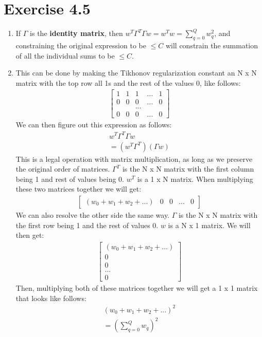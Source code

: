 \documentclass[12pt]{article}
\begin{document}
\section*{Exercise 4.5}
\begin{enumerate}[label=(\alph*)]
	\item If $\Gamma$ is the \textbf{identity matrix}, then $w^T\Gamma^T\Gamma w = w^Tw = \sum^Q_{q=0}w_q^2$, and constraining the original expression to be $\le C$ will constrain the summation of all the individual sums to be $\le C$.
	\item This can be done by making the Tikhonov regularization constant an N x N matrix with the top row all 1s and the rest of the values 0, like follows:
	\begin{gather*}
	\begin{bmatrix}
	1 & 1 & 1 & ... & 1
	\\ 0 & 0 & 0 & ... & 0
	\\ & & ...
	\\ 0 & 0 & 0 & ... & 0
	\end{bmatrix}
	\end{gather*}
	We can then figure out this expression as follows:
	\begin{gather*}
	w^T\Gamma^T\Gamma w
	\\ = (w^T\Gamma^T)(\Gamma w)
	\end{gather*}
	This is a legal operation with matrix multiplication, as long as we preserve the original order of matrices. $\Gamma^T$ is the N x N matrix with the first column being 1 and rest of values being 0. $w^T$ is a 1 x N matrix. When multiplying these two matrices together we will get:
	\begin{gather*}
	\begin{bmatrix}
	(w_0 + w_1 + w_2 + ...) & 0 & 0 & ... & 0
	\end{bmatrix}
	\end{gather*}
	We can also resolve the other side the same way. $\Gamma$ is the N x N matrix with the first row being 1 and the rest of values 0. $w$ is a N x 1 matrix. We will then get:
	\begin{gather*}
	\begin{bmatrix}
	(w_0 + w_1 + w_2 + ...) \\ 0 \\ 0 \\ ... \\ 0
	\end{bmatrix}
	\end{gather*}
	Then, multiplying both of these matrices together we will get a 1 x 1 matrix that looks like follows:
	\begin{gather*}
	(w_0 + w_1 + w_2 + ...)^2
	\\ = (\sum^Q_{q=0}w_q)^2
	\end{gather*}
\end{enumerate}
\end{document}
